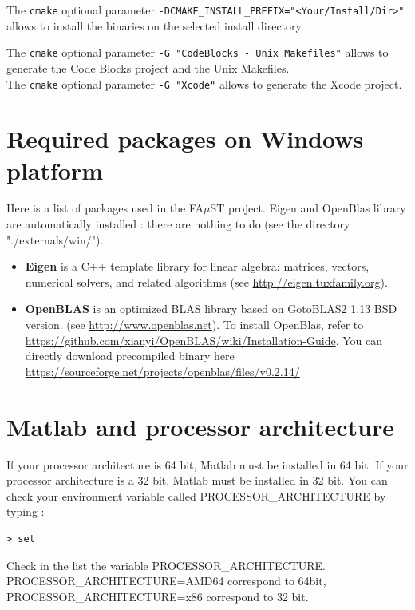 The \texttt{cmake} optional parameter \texttt{-DCMAKE\_INSTALL\_PREFIX="<Your/Install/Dir>"} allows to install the binaries on the selected install directory. 

The \texttt{cmake} optional parameter \texttt{-G "CodeBlocks - Unix Makefiles"} allows to generate the Code Blocks project and the Unix Makefiles.\\ 
The \texttt{cmake} optional parameter \texttt{-G "Xcode"} allows to generate the Xcode project. 




\section{Required packages on Windows platform}\label{sec:WinRequiredPackages}
Here is a list of packages used in the FA$\mu$ST project. Eigen and OpenBlas library are automatically installed : there are nothing to do (see the directory "./externals/win/").
\begin{itemize}
\item \textbf{Eigen} is a C++ template library for linear algebra: matrices, vectors, numerical solvers, and related algorithms (see \url{http://eigen.tuxfamily.org}).
\item \textbf{OpenBLAS} is an optimized BLAS library based on GotoBLAS2 1.13 BSD version. (see \url{http://www.openblas.net}). To install OpenBlas, refer to \url{https://github.com/xianyi/OpenBLAS/wiki/Installation-Guide}. You can directly download precompiled binary here \url{https://sourceforge.net/projects/openblas/files/v0.2.14/}
\end{itemize}

\section{Matlab and processor architecture}\label{sec:ANNEXEMatlabArch}
If your processor architecture is 64 bit, Matlab must be installed in 64 bit. If your processor architecture is a 32 bit, Matlab must be installed in 32 bit. You can check your environment variable called PROCESSOR\_ARCHITECTURE by typing :
\lstset{style=customBash}
\begin{lstlisting}
> set
\end{lstlisting}
Check in the list the variable PROCESSOR\_ARCHITECTURE. \\
PROCESSOR\_ARCHITECTURE=AMD64 correspond to 64bit, 
PROCESSOR\_ARCHITECTURE=x86 correspond to 32 bit.



